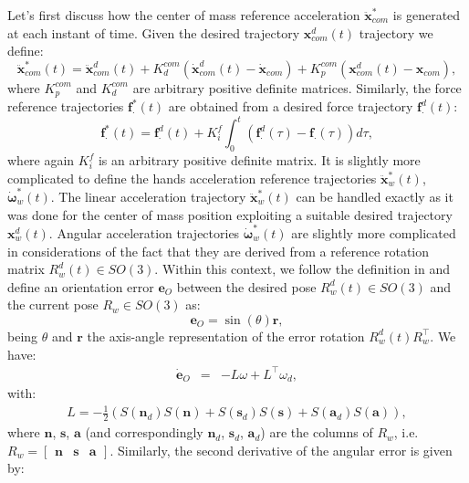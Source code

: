 \documentclass[12pt,a4paper,twoside]{article}
\begin{document}
Let's first discuss how the center of mass reference acceleration $\ddot {\bm x}_{com}^*$ is generated at each instant of time. Given the desired trajectory ${\bm x}_{com}^d (t)$ trajectory we define:
\begin{equation} \label{eq:accRef}
\ddot {\bm x}_{com}^* (t) = \ddot {\bm x}_{com}^d (t) + K_d^{com} \left( \dot {\bm x}_{com}^d (t) - \dot {\bm x}_{com}\right) + K_p^{com} \left( {\bm x}_{com}^d (t) - {\bm x}_{com}\right),
\end{equation}
where $K_p^{com}$ and $K_d^{com}$ are arbitrary positive definite matrices. Similarly, the force reference trajectories ${\bm f}^*_{\cdot} (t)$ are obtained from a desired force trajectory ${\bm f}^d_{\cdot} (t)$:
\begin{equation} \label{eq:fRef}
{\bm f}_{\cdot}^* (t) = {\bm f}_{\cdot}^d (t) + K_i^f \int_0^t \left( {\bm f}_{\cdot}^d (\tau) - {\bm f}_{\cdot} (\tau) \right) d \tau,
\end{equation}
where again $K_i^f$ is an arbitrary positive definite matrix. It is slightly more complicated to define the hands acceleration reference trajectories  ${\ddot {\bm x}}^*_w(t)$, ${\dot {\bm \omega}}_w^* (t)$. The linear acceleration trajectory ${\ddot {\bm x}}^*_w(t)$ can be handled exactly as it was done for the center of mass position exploiting a suitable desired trajectory ${{\bm x}}^d_w(t)$. Angular acceleration trajectories ${\dot {\bm \omega}}_w^* (t)$ are slightly more complicated in considerations of the fact that they are derived from a reference rotation matrix $R^d_w(t) \in SO(3)$. Within this context, we follow the definition in \cite{siciliano2009} and define an orientation error $\bm e_O$ between the desired pose $R^d_w(t) \in SO(3)$ and the current pose $R_w \in SO(3)$ as:
$$
\bm e_O = \sin(\theta) \bm r,
$$
being $\theta$ and $\bm r$ the axis-angle representation of the error rotation $R^d_w(t) R_w^\top$. We have: 
\begin{eqnarray*} 
\dot {\bm e}_O & = & -L \omega + L^\top \omega_d,
\end{eqnarray*}
with:
\begin{eqnarray*} 
L = - \frac{1}{2} \left( S({\bm n_d}) S(\bm n) + S({\bm s}_d) S(\bm s) + S({\bm a}_d) S(\bm a) \right),
\end{eqnarray*}
where $\bm n$, $\bm s$, $\bm a$ (and correspondingly $\bm n_d$, $\bm s_d$, $\bm a_d$) are the columns of $R_w$, i.e. $R_w = \begin{bmatrix} \bm n & \bm s & \bm a \end{bmatrix}$. Similarly, the second derivative of the angular error is given by:
\end{document}

